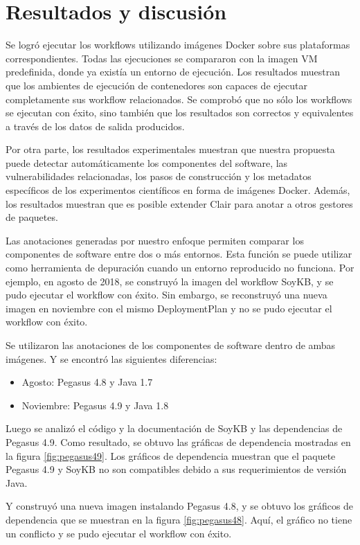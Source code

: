     
\section{Resultados y discusión}\label{s5.4}
Se logró ejecutar los workflows utilizando imágenes Docker sobre sus plataformas correspondientes.
Todas las ejecuciones se compararon con la imagen VM predefinida, donde ya existía un entorno de ejecución. Los resultados muestran que los ambientes de ejecución de contenedores son capaces de ejecutar completamente sus workflow relacionados. Se  comprobó que no sólo los workflows se ejecutan con éxito, sino también que los resultados son correctos y equivalentes a través de los datos de salida producidos. 

Por otra parte, los resultados experimentales muestran que nuestra propuesta puede detectar automáticamente los componentes del software, las vulnerabilidades relacionadas, los pasos de construcción y los metadatos específicos de los experimentos científicos en forma de imágenes Docker. 
Además, los resultados muestran que es posible extender Clair para anotar a otros gestores de paquetes. 

Las anotaciones generadas por nuestro enfoque permiten comparar los componentes de software entre dos o más entornos. Esta función se puede utilizar como herramienta de depuración cuando un entorno reproducido no funciona.
Por ejemplo, en agosto de 2018, se construyó la imagen del workflow SoyKB, y se pudo ejecutar el workflow con éxito. Sin embargo, se reconstruyó una nueva imagen en noviembre con el mismo DeploymentPlan y no se pudo ejecutar el workflow con éxito.


Se utilizaron las anotaciones de los componentes de software dentro de ambas imágenes. Y se encontró las siguientes diferencias:
\begin{itemize}
    \item Agosto: Pegasus 4.8 y Java 1.7
    \item Noviembre: Pegasus 4.9 y Java 1.8
\end{itemize}

Luego se analizó el código y la documentación de SoyKB y las dependencias de Pegasus 4.9. Como resultado, se obtuvo las gráficas de dependencia mostradas en la figura \ref{fig:pegasus49}.  Los gráficos de dependencia muestran que el paquete Pegasus 4.9 y SoyKB no son compatibles debido a sus requerimientos de versión Java.

Y construyó una nueva imagen instalando Pegasus 4.8, y se obtuvo los gráficos de dependencia que se muestran en la figura \ref{fig:pegasus48}. Aquí, el gráfico no tiene un conflicto y se pudo ejecutar el workflow con éxito.

